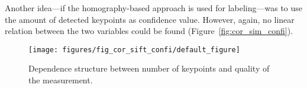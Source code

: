 Another idea---if the homography-based approach is used for
labeling---was to use the amount of detected keypoints as confidence
value. However, again, no linear relation between the two variables
could be found (Figure~\ref{fig:cor_sim_confi}).

\begin{figure}[h!]
\begin{center}
\texttt{[image: figures/fig\_cor\_sift\_confi/default\_figure]}
\caption{{\label{fig:cor_sift_confi} Dependence structure between number of keypoints and quality
    of the measurement.%
}}
\end{center}
\end{figure}

